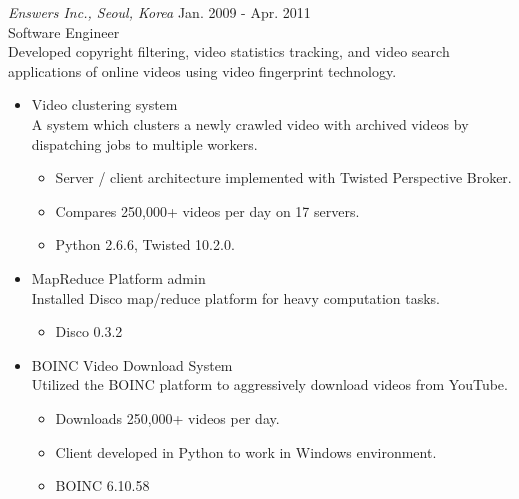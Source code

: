 \documentclass[line,margin]{res}
\begin{document}
\begin{resume}
                     {\sl Enswers Inc., Seoul, Korea} \hfill Jan. 2009 - Apr. 2011 \\
                     Software Engineer \\
                     Developed copyright filtering, video statistics tracking,
                     and video search applications of online videos using video fingerprint technology.
                     \begin{itemize}  \itemsep 2pt %
                     \item Video clustering system \\ A system which clusters a newly crawled video with archived videos
                                                      by dispatching jobs to multiple workers.
                           \begin{itemize}
                               \item Server / client architecture implemented with Twisted Perspective Broker.
                               \item Compares 250,000+ videos per day on 17 servers.
                               \item Python 2.6.6, Twisted 10.2.0.
                           \end{itemize}
                     \item MapReduce Platform admin \\ Installed Disco map/reduce platform for heavy computation tasks.
                               \begin{itemize}
                                   \item Disco 0.3.2
                               \end{itemize}
                     \item BOINC Video Download System \\ Utilized the BOINC platform to aggressively download videos
                                                          from YouTube.
                     \begin{itemize}
                         \item Downloads 250,000+ videos per day.
                         \item Client developed in Python to work in Windows environment.
                         \item BOINC 6.10.58
                     \end{itemize}


\end{itemize}
\end{resume}
\end{document}
